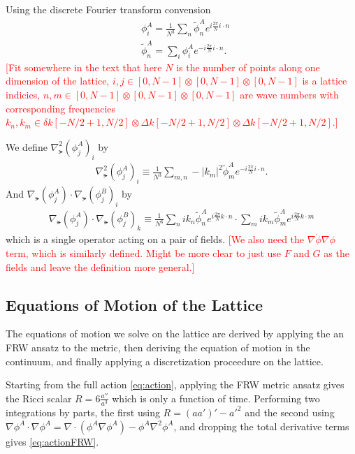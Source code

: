 Using the discrete Fourier transform convension
\begin{align}
  &\phi^A_i = \frac{1}{N^3}\sum_n\tilde{\phi}^A_n e^{i\frac{2\pi}{N}i\cdot n} \\
  &\tilde{\phi}^A_n = \sum_i\phi^A_i e^{-i\frac{2\pi}{N}i\cdot n}.
\end{align}
\textcolor{red}{[Fit somewhere in the text that here $N$ is the number of points along one dimension of the lattice, $i,j \in [0,N-1]\otimes[0,N-1]\otimes[0,N-1]$ is a lattice indicies,  $n,m \in [0,N-1]\otimes[0,N-1]\otimes[0,N-1]$ are wave numbers with corresponding frequencies $k_n,k_m \in \delta k [-N/2+1,N/2] \otimes \Delta k [-N/2+1,N/2] \otimes \Delta k [-N/2+1,N/2]$.]}

We define $\nabla^2_\lat(\phi^A_j)_i$ by
\begin{align} \label{eq:laplacian}
  \nabla^2_\lat(\phi^A_j)_i \equiv \frac{1}{N^3} \sum_{m,n} -|k_m|^2 \tilde{\phi}^A_m e^{-i\frac{2\pi}{N}i\cdot n}.
\end{align}
And $\nabla_\lat(\phi^A_j)\cdot\nabla_\lat(\phi^B_j)_i$ by 
\begin{align} \label{eq:grad dot grad}
  \nabla_\lat(\phi^A_j)\cdot\nabla_\lat(\phi^B_j)_k \equiv
  \frac{1}{N^6}\sum_nik_n\tilde{\phi}^A_ne^{i\frac{2\pi}{N}k\cdot n}\cdot\sum_mik_m\tilde{\phi}^A_me^{i\frac{2\pi}{N}k\cdot m}
\end{align}
which is a single operator acting on a pair of fields.
\textcolor{red}{[We also need the $\nabla\dot{\phi}\nabla\phi$ term, which is similarly defined. Might be more clear to just use $F$ and $G$ as the fields and leave the definition more general.]}

\subsection{Equations of Motion of the Lattice}
The equations of motion we solve on the lattice are derived by applying the an FRW ansatz to the metric, then deriving the equation of motion in the continuum, and finally applying a discretization proceedure on the lattice. 

Starting from the full action \eqref{eq:action}, applying the FRW metric ansatz gives the Ricci scalar $R=6\frac{a''}{a^3}$ which is only a function of time. Performing two integrations by parts, the first using $R=(aa')'-{a'}^2$ and the second using $\nabla\phi^A\cdot\nabla\phi^A = \nabla\cdot(\phi^A\nabla\phi^A) - \phi^A\nabla^2\phi^A$, and dropping the total derivative terms gives \eqref{eq:actionFRW}.

